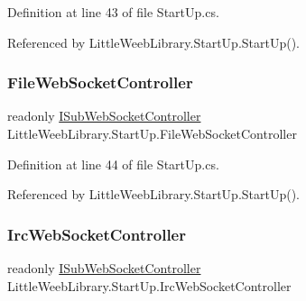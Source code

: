 Definition at line 43 of file Start\+Up.\+cs.



Referenced by Little\+Weeb\+Library.\+Start\+Up.\+Start\+Up().

\mbox{\label{class_little_weeb_library_1_1_start_up_a98e8d01c4660f0288eb114f2a11c8d4d}} 
\subsubsection{\texorpdfstring{File\+Web\+Socket\+Controller}{FileWebSocketController}}
{\footnotesize\ttfamily readonly \mbox{\hyperlink{interface_little_weeb_library_1_1_controllers_1_1_i_sub_web_socket_controller}{I\+Sub\+Web\+Socket\+Controller}} Little\+Weeb\+Library.\+Start\+Up.\+File\+Web\+Socket\+Controller\hspace{0.3cm}{\ttfamily [private]}}



Definition at line 44 of file Start\+Up.\+cs.



Referenced by Little\+Weeb\+Library.\+Start\+Up.\+Start\+Up().

\mbox{\label{class_little_weeb_library_1_1_start_up_a47d1759095fa3e41fccb1a6d6997a91c}} 
\subsubsection{\texorpdfstring{Irc\+Web\+Socket\+Controller}{IrcWebSocketController}}
{\footnotesize\ttfamily readonly \mbox{\hyperlink{interface_little_weeb_library_1_1_controllers_1_1_i_sub_web_socket_controller}{I\+Sub\+Web\+Socket\+Controller}} Little\+Weeb\+Library.\+Start\+Up.\+Irc\+Web\+Socket\+Controller\hspace{0.3cm}{\ttfamily [private]}}



